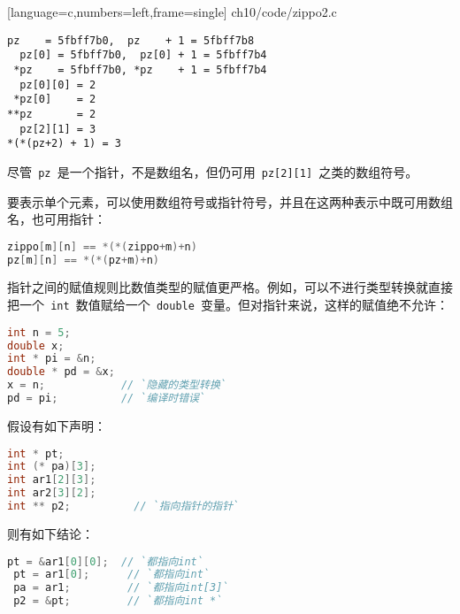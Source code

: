 \begin{frame}

[language=c,numbers=left,frame=single]
{ch10/code/zippo2.c}
\end{frame}


\begin{frame}[fragile]
\begin{lstlisting}[backgroundcolor=\color{red!20}]
  pz    = 5fbff7b0,  pz    + 1 = 5fbff7b8
  pz[0] = 5fbff7b0,  pz[0] + 1 = 5fbff7b4
 *pz    = 5fbff7b0, *pz    + 1 = 5fbff7b4
  pz[0][0] = 2
 *pz[0]    = 2
**pz       = 2
  pz[2][1] = 3
*(*(pz+2) + 1) = 3
\end{lstlisting}
\end{frame}

\begin{frame}[fragile]
尽管\lstinline| pz |是一个指针，不是数组名，但仍可用\lstinline| pz[2][1] |之类的数组符号。\vspace{.05in}

要表示单个元素，可以使用数组符号或指针符号，并且在这两种表示中既可用数组名，也可用指针：
\begin{lstlisting}[language=c,backgroundcolor=\color{red!20}]
zippo[m][n] == *(*(zippo+m)+n)
pz[m][n] == *(*(pz+m)+n)
\end{lstlisting}
\end{frame}

\begin{frame}[fragile]
指针之间的赋值规则比数值类型的赋值更严格。例如，可以不进行类型转换就直接把一个\lstinline| int |数值赋给一个\lstinline| double |变量。但对指针来说，这样的赋值绝不允许：
\begin{lstlisting}[language=c,backgroundcolor=\color{red!20}]
int n = 5;
double x;
int * pi = &n;
double * pd = &x;
x = n;            // `隐藏的类型转换`
pd = pi;          // `编译时错误`
\end{lstlisting}
\end{frame}

\begin{frame}[fragile]
假设有如下声明：
\begin{lstlisting}[language=c,backgroundcolor=\color{red!20}]
int * pt;
int (* pa)[3];
int ar1[2][3];
int ar2[3][2];
int ** p2;          // `指向指针的指针`
\end{lstlisting}
则有如下结论：
\begin{lstlisting}[language=c,backgroundcolor=\color{red!20}]
 pt = &ar1[0][0];  // `都指向int`
 pt = ar1[0];      // `都指向int`
 pa = ar1;         // `都指向int[3]`
 p2 = &pt;         // `都指向int *`
\end{lstlisting}
\end{frame}

